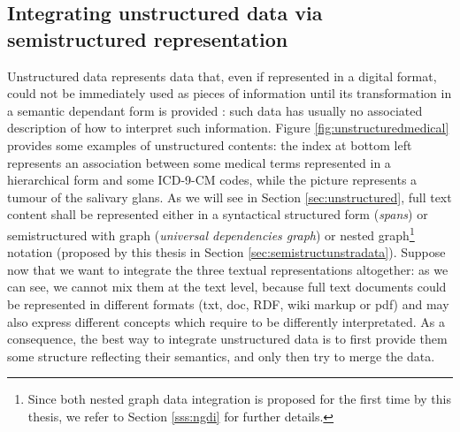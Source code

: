 \subsection{Integrating unstructured data via semistructured representation}\label{sec:idifud}
Unstructured data represents data that, even if represented in a digital format, could not be  immediately used as pieces of information %
 until its transformation in a semantic dependant form is provided \cite{OrgKno}: such data has usually no associated description of how to interpret such information. Figure \ref{fig:unstructuredmedical} provides some examples of unstructured contents: the index at bottom left represents an association between some medical terms represented in a hierarchical form and some ICD-9-CM codes, while the picture represents a tumour of the salivary glans. As we will see in Section \vref{sec:unstructured}, full text content shall be represented either in a syntactical structured form (\textit{spans}) or semistructured with graph (\textit{universal dependencies graph}) or nested graph\footnote{Since both nested graph data integration is proposed for the first time by this thesis, we refer to Section \vref{sss:ngdi} for further details.} notation (proposed by this thesis in Section \vref{sec:semistructunstradata}). Suppose now that we want to integrate the three textual representations altogether: as we can see, we cannot mix them at the text level, because  full text documents could be represented in different formats (txt, doc, RDF, wiki markup or pdf) and may also express different concepts which require to be differently interpretated. As a consequence, the best way to integrate unstructured data is to first provide them some structure reflecting their semantics, and only then try to merge the data.
